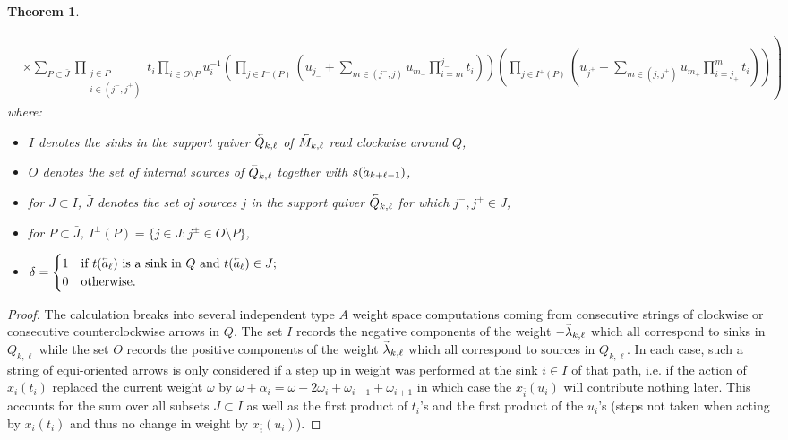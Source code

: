 \documentclass[12pt]{amsart}
\renewcommand{\vec}[1]{\accentset{\shortrightarrow}{#1}}
\newcommand{\cev}[1]{\accentset{\shortleftarrow}{#1}}
\newtheorem{theorem}{Theorem}[section]
\numberwithin{equation}{section}
\begin{document}
{\begin{theorem}
\begin{enumerate}
\begin{align}
        \nonumber&\times\left.\sum_{P\subset\bar{J}}\prod_{\substack{j\in P\\i\in(j^-,j^+)}}t_i\prod_{i\in O\setminus P}u_i^{-1}\left(\prod_{j\in I^-(P)}\left(u_{j_-}+\sum_{m\in(j^-,j)}u_{m_-}\prod_{i=m}^{j_-}t_i\right)\right)\left(\prod_{j\in I^+(P)}\left(u_{j^+}+\sum_{m\in(j,j^+)}u_{m_+}\prod_{i=j_+}^m t_i\right)\right)\right)
      \end{align}
      where:
      \begin{itemize}
        \item $I$ denotes the sinks in the support quiver $\cev{Q}_{k,\ell}$ of $\cev{M}_{k,\ell}$ read clockwise around $Q$,
        \item $O$ denotes the set of internal sources of $\cev{Q}_{k,\ell}$ together with $s(\cev{a}_{k+\ell-1})$,
        \item for $J\subset I$, $\bar{J}$ denotes the set of sources $j$ in the support quiver $\cev{Q}_{k,\ell}$ for which $j^-,j^+\in J$,
        \item for $P\subset\bar{J}$, $I^\pm(P)=\{j\in J:j^\pm\in O\setminus P\}$,
        \item $\delta=\begin{cases}1 & \text{if $t(\cev{a}_\ell)$ is a sink in $Q$ and $t(\cev{a}_\ell)\in J$;}\\0 & \text{otherwise.}\end{cases}$
      \end{itemize}
    \end{enumerate}
  \end{theorem}
  \begin{proof}
    The calculation breaks into several independent type $A$ weight space computations coming from consecutive strings of clockwise or consecutive counterclockwise arrows in $Q$.  The set $I$ records the negative components of the weight $-\vec{\lambda}_{k,\ell}$ which all correspond to sinks in $Q_{k,\ell}$ while the set $O$ records the positive components of the weight $\vec{\lambda}_{k,\ell}$ which all correspond to sources in $Q_{k,\ell}$.  In each case, such a string of equi-oriented arrows is only considered if a step up in weight was performed at the sink $i\in I$ of that path, i.e. if the action of $x_i(t_i)$ replaced the current weight $\omega$ by $\omega+\alpha_i=\omega-2\omega_i+\omega_{i-1}+\omega_{i+1}$ in which case the $x_{\bar{i}}(u_i)$ will contribute nothing later.  This accounts for the sum over all subsets $J\subset I$ as well as the first product of $t_i$'s and the first product of the $u_i$'s (steps not taken when acting by $x_i(t_i)$ and thus no change in weight by $x_{\bar{i}}(u_i)$).


\end{proof}}
\end{document}
